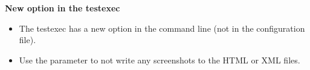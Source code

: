 \textbf{New option in the testexec}
\begin{itemize}
\item The testexec has a new option in the command line (not in the configuration file).
\item Use the parameter  to not write any screenshots to the HTML or XML files.
\end{itemize}

